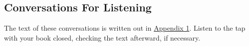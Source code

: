 \subsection{Conversations For Listening}

The text of these conversations is written out in \hyperref[sec:appendix-lesson2]{Appendix 1}. Listen to the tap with your book closed, checking the text afterward, if necessary.